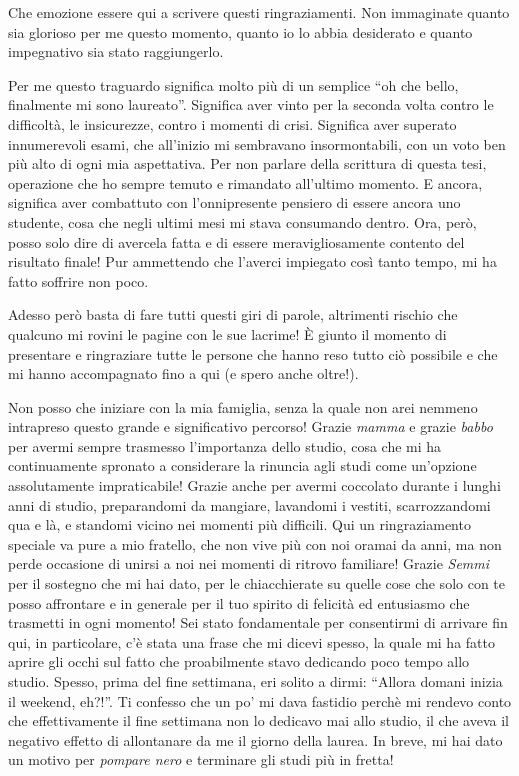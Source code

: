 \begin{acknowledgements}
  Che emozione essere qui a scrivere questi ringraziamenti.
  Non immaginate quanto sia glorioso per me questo momento, quanto io lo abbia desiderato e quanto impegnativo sia stato raggiungerlo.

  Per me questo traguardo significa molto più di un semplice ``oh che bello, finalmente mi sono laureato''.
  Significa aver vinto per la seconda volta contro le difficoltà, le insicurezze, contro i momenti di crisi.
  Significa aver superato innumerevoli esami, che all'inizio mi sembravano insormontabili, con un voto ben più alto di ogni mia aspettativa.
  Per non parlare della scrittura di questa tesi, operazione che ho sempre temuto e rimandato all'ultimo momento.
  E ancora, significa aver combattuto con l'onnipresente pensiero di essere ancora uno studente, cosa che negli ultimi mesi mi stava consumando dentro.
  Ora, però, posso solo dire di avercela fatta e di essere meravigliosamente contento del risultato finale!
  Pur ammettendo che l'averci impiegato così tanto tempo, mi ha fatto soffrire non poco.

  Adesso però basta di fare tutti questi giri di parole, altrimenti rischio che qualcuno mi rovini le pagine con le sue lacrime!
  È giunto il momento di presentare e ringraziare tutte le persone che hanno reso tutto ciò possibile e che mi hanno accompagnato fino a qui (e spero anche oltre!).

  Non posso che iniziare con la mia famiglia, senza la quale non arei nemmeno intrapreso questo grande  e significativo percorso! Grazie \emph{mamma} e grazie \emph{babbo} per avermi sempre trasmesso l'importanza dello studio, cosa che mi ha continuamente spronato a considerare la rinuncia agli studi come un'opzione assolutamente impraticabile! Grazie anche per avermi coccolato durante i lunghi anni di studio, preparandomi da mangiare, lavandomi i vestiti, scarrozzandomi qua e là, e standomi vicino nei momenti più difficili. Qui un ringraziamento speciale va pure a mio fratello, che non vive più con noi oramai da anni, ma non perde occasione di unirsi a noi nei momenti di ritrovo familiare! Grazie \emph{Semmi} per il sostegno che mi hai dato, per le chiacchierate su quelle cose che solo con te posso affrontare e in generale per il tuo spirito di felicità ed entusiasmo che trasmetti in ogni momento! Sei stato fondamentale per consentirmi di arrivare fin qui, in particolare, c'è stata una frase che mi dicevi spesso, la quale mi ha fatto aprire gli occhi sul fatto che proabilmente stavo dedicando poco tempo allo studio. Spesso, prima del fine settimana, eri solito a dirmi: ``Allora domani inizia il weekend, eh?!''. Ti confesso che un po' mi dava fastidio perchè mi rendevo conto che effettivamente il fine settimana non lo dedicavo mai allo studio, il che aveva il negativo effetto di allontanare da me il giorno della laurea. In breve, mi hai dato un motivo per \emph{pompare nero} e terminare gli studi più in fretta!


\end{acknowledgements}
